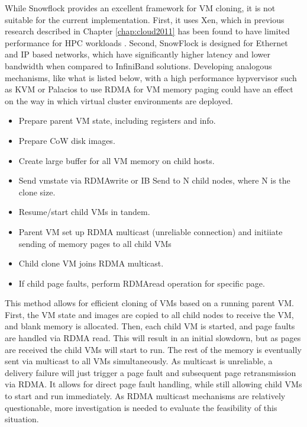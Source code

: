 While Snowflock provides an excellent framework for VM cloning, it is not suitable for the current implementation. First, it uses Xen, which in previous research described in Chapter \ref{chap:cloud2011} has been found to have limited performance for HPC workloads \cite{Younge2011cloud}.  Second, SnowFlock is designed for Ethernet and IP based networks, which have significantly higher latency and lower bandwidth when compared to InfiniBand solutions.  Developing analogous mechanisms, like what is listed below, with a high performance hypvervisor such as KVM or Palacios \cite{lange2010palacios} to use RDMA for VM memory paging could have an effect on the way in which virtual cluster environments are deployed. %

\begin{itemize}
\item Prepare parent VM state, including registers and info.
\item Prepare CoW disk images.
\item Create large buffer for all VM memory on child hosts. 
\item Send vmstate via RDMAwrite or IB Send to N child nodes, where N is the clone size.
\item Resume/start child VMs in tandem. 
\item Parent VM set up RDMA multicast (unreliable connection) and initiiate sending of memory pages to all child VMs 
\item Child clone VM joins RDMA multicast.
\item If child page faults, perform RDMAread operation for specific page. 
\end{itemize}

This method allows for efficient cloning of VMs based on a running parent VM. First, the VM state and images are copied to all child nodes to receive the VM, and blank memory is allocated. Then, each child VM is started, and page faults are handled via RDMA read. This will result in an initial slowdown, but as pages are received the child VMs will start to run. The rest of the memory is eventually sent via multicast to all VMs simultaneously.   As multicast is unreliable, a delivery failure will just trigger a page fault and subsequent page retransmission via RDMA.  It allows for direct page fault handling, while still allowing child VMs to start and run immediately. As RDMA multicast mechanisms are relatively questionable,  more investigation is needed to evaluate the feasibility of this situation. %

